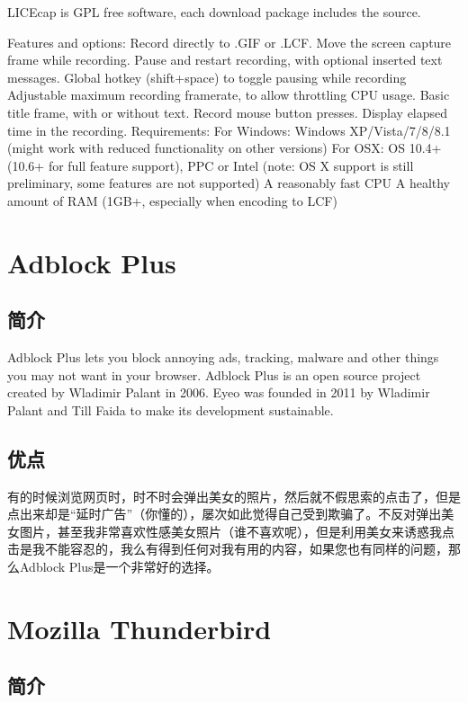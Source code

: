 \documentclass[paper=a4,fontsize=11pt]{article}
\begin{document}
	LICEcap is GPL free software, each download package includes the source. 
	
	Features and options:
	Record directly to .GIF or .LCF.
	Move the screen capture frame while recording.
	Pause and restart recording, with optional inserted text messages.
	Global hotkey (shift+space) to toggle pausing while recording
	Adjustable maximum recording framerate, to allow throttling CPU usage.
	Basic title frame, with or without text.
	Record mouse button presses.
	Display elapsed time in the recording.
	Requirements:
	For Windows: Windows XP/Vista/7/8/8.1 (might work with reduced functionality on other versions)
	For OSX: OS 10.4+ (10.6+ for full feature support), PPC or Intel (note: OS X support is still preliminary, some features are not supported)
	A reasonably fast CPU
	A healthy amount of RAM (1GB+, especially when encoding to LCF)
	
	\section{Adblock Plus}
	
	\subsection{简介}
	
	Adblock Plus lets you block annoying ads, tracking, malware and other things you may not want in your browser. Adblock Plus is an open source project created by Wladimir Palant in 2006. Eyeo was founded in 2011 by Wladimir Palant and Till Faida to make its development sustainable.
	
	
	\subsection{优点}
	
	有的时候浏览网页时，时不时会弹出美女的照片，然后就不假思索的点击了，但是点出来却是“延时广告”（你懂的），屡次如此觉得自己受到欺骗了。不反对弹出美女图片，甚至我非常喜欢性感美女照片（谁不喜欢呢），但是利用美女来诱惑我点击是我不能容忍的，我么有得到任何对我有用的内容，如果您也有同样的问题，那么Adblock Plus是一个非常好的选择。
	
	\section{Mozilla Thunderbird}
	
	\subsection{简介}
	
\end{document}
